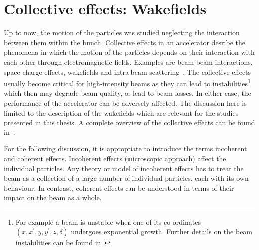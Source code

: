 \section{Collective effects: Wakefields}\label{sec:collective_effects}
Up to now, the motion of the particles was studied neglecting the interaction between them within the bunch. Collective effects in an accelerator desribe the phenomena in which the motion of the particles depends on their interaction with each other through electromagnetic fields. Examples are beam-beam interactions, space charge effects, wakefields and intra-beam scattering~\cite{Zimmermann:2264408}. The collective effects usually become critical for high-intensity beams as they can lead to instabilities\footnote{For example a beam is unstable when one of its co-ordinates $(x, x^\prime, y, y^\prime, z, \delta)$ undergoes exponential growth. Further details on the beam instabilities can be found in~\cite{Rumolo:1982422}} which then may degrade beam quality, or lead to beam losses. In either case, the performance of the accelerator can be adversely affected. The discussion here is limited to the description of the wakefields which are relevant for the studies presented in this thesis. A complete overview of the collective effects can be found in~\cite{wolski2014, Zimmermann:2264408, Chao:collective}.



For the following discussion, it is appropriate to introduce the terms incoherent and coherent effects. Incoherent effects (microscopic approach) affect the individual particles. Any theory or model of incoherent effects has to treat the beam as a collection of a large number of individual particles, each with its own behaviour. In contrast, coherent effects can be understood in terms of their impact on the beam as a whole.%


